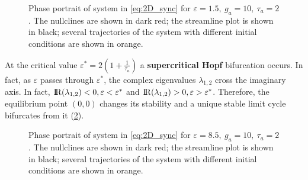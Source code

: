 \begin{figure}[H]
        \caption{\label{fig:eq2D_focus} Phase portrait of system in \eqref{eq:2D_sync} for $\varepsilon=1.5,\ g_a=10,\ \tau_a=2$. The nullclines are shown in dark red; the streamline plot is shown in black; several trajectories of the system with different initial conditions are shown in orange.}
\end{figure}


At the critical value $\varepsilon^* = 2 ( 1 + \frac{1}{\tau_a} ) $ a \textbf{supercritical Hopf} bifurcation occurs. In fact, as $\varepsilon$ passes through $\varepsilon^*$, the complex eigenvalues $\lambda_{1,2}$ cross the imaginary axis. In fact, ${\rm I\!R}(\lambda_{1,2})<0, \varepsilon < \varepsilon^*$ and  ${\rm I\!R}(\lambda_{1,2})>0, \varepsilon > \varepsilon^*$. Therefore, the equilibrium point $(0, 0)$ changes its stability and a unique stable limit cycle bifurcates from it (\cref{fig:eq2D_cycle}).

\begin{figure}[H]
        \caption{\label{fig:eq2D_cycle} Phase portrait of system in \eqref{eq:2D_sync} for $\varepsilon=8.5,\ g_a=10,\ \tau_a=2$. The nullclines are shown in dark red; the streamline plot is shown in black; several trajectories of the system with different initial conditions are shown in orange.}
\end{figure}

